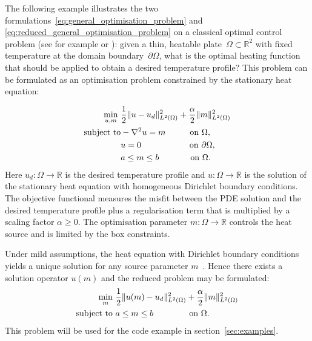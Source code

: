 \documentclass[prodmode,acmtoms]{acmsmall}
\begin{document}
The following example illustrates the two formulations~\eqref{eq:general_optimisation_problem} and \eqref{eq:reduced_general_optimisation_problem} on a classical optimal control problem (see for example  or ): 
given a thin, heatable plate~$\Omega \subset \mathbb R^2$ with fixed temperature at the domain boundary~$\partial \Omega$, what is the optimal heating function that should be applied to obtain a desired temperature 
profile?
This problem can be formulated as an optimisation problem constrained by the stationary heat equation:

\begin{equation}
\begin{aligned}
\min_{u, m}~&\frac{1}{2} \| u - u_d \|^2_{L^2(\Omega)} + \frac{\alpha}{2} \| m \|^2_{L^2({\Omega})} \\
\textrm{subject to} 
& -\nabla^2 u  = m \hspace{1cm} \textrm{on } \Omega, \\& u  = 0 \hspace{2cm} \textrm{on } \partial \Omega, \\& a \le m \le b \hspace{1.3cm} \textrm{on } \Omega. 
\end{aligned}\label{eq:optimal_control_with_heat_equation_con_example}\end{equation}
Here $u_d: \Omega \to \mathbb R$ is the desired temperature profile and $u: \Omega \to \mathbb R$ is the solution of the stationary heat equation with homogeneous Dirichlet boundary conditions.
The objective functional measures the misfit between the PDE solution and the desired temperature profile plus a regularisation term that is multiplied by a scaling factor $\alpha  \ge 0$. 
The optimisation parameter $m: \Omega \to \mathbb R$ controls the heat source and is limited by the box constraints.

Under mild assumptions, the heat equation with Dirichlet boundary conditions yields a unique solution for any source parameter $m$~\cite[\S 1.3.1.1]{hinze2009}.
Hence there exists a solution operator $u(m)$ and the reduced problem may be formulated:
\begin{equation*}
\begin{aligned}
\min_m~&\frac{1}{2} \| u(m) - u_d \|^2_{L^2(\Omega)}  + \frac{\alpha}{2} \| m \|^2_{L^2({\Omega})}  \\
 \textrm{subject to } 
 & a  \le m \le b \hspace{1.5cm} \textrm{on } \Omega. 
\end{aligned}\end{equation*}
This problem will be used for the code example in section~\ref{sec:examples}.
\end{document}
